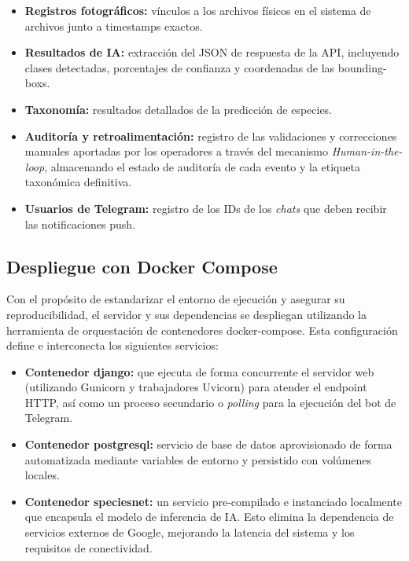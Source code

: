 \documentclass[a4paper, 12pt]{report}
\begin{document}
\begin{itemize}
  \item \textbf{Registros fotográficos:} vínculos a los archivos físicos en el sistema de archivos junto a timestamps exactos.
  \item \textbf{Resultados de IA:} extracción del JSON de respuesta de la API, incluyendo clases detectadas, porcentajes de confianza y coordenadas de las \glspl{bounding-box}.
  \item \textbf{Taxonomía:} resultados detallados de la predicción de especies.
  \item \textbf{Auditoría y retroalimentación:} registro de las validaciones y correcciones manuales aportadas por los operadores a través del mecanismo \textit{Human-in-the-loop}, almacenando el estado de auditoría de cada evento y la etiqueta taxonómica definitiva.
  \item \textbf{Usuarios de Telegram:} registro de los IDs de los \textit{chats} que deben recibir las notificaciones push.
\end{itemize}

\subsection{Despliegue con Docker Compose}

Con el propósito de estandarizar el entorno de ejecución y asegurar su reproducibilidad, el servidor y sus dependencias se despliegan utilizando la herramienta de orquestación de contenedores \gls{docker-compose}. Esta configuración define e interconecta los siguientes servicios:

\begin{itemize}
  \item \textbf{Contenedor \gls{django}:} que ejecuta de forma concurrente el servidor web (utilizando Gunicorn y trabajadores Uvicorn) para atender el \gls{endpoint} HTTP, así como un proceso secundario o \textit{polling} para la ejecución del bot de Telegram.
  \item \textbf{Contenedor \gls{postgresql}:} servicio de base de datos aprovisionado de forma automatizada mediante variables de entorno y persistido con volúmenes locales.
  \item \textbf{Contenedor \gls{speciesnet}:} un servicio pre-compilado e instanciado localmente que encapsula el modelo de inferencia de IA. Esto elimina la dependencia de servicios externos de Google, mejorando la latencia del sistema y los requisitos de conectividad.
\end{itemize}
\end{document}
